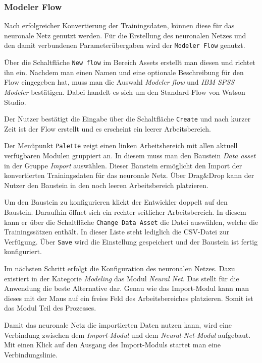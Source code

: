\subsubsection{Modeler Flow}
\label{subsub:modeler_flow}
Nach erfolgreicher Konvertierung der Trainingsdaten, können diese für das neuronale Netz genutzt werden. Für die
Erstellung des neuronalen Netzes und den damit verbundenen Parameterübergaben wird der \texttt{Modeler Flow} genutzt.

Über die Schaltfläche \texttt{New flow} im Bereich Assets erstellt man diesen und richtet ihn ein. Nachdem man einen Namen
und eine optionale Beschreibung für den Flow eingegeben hat, muss man die Auswahl \textit{Modeler flow} und
\textit{IBM SPSS Modeler} bestätigen. Dabei handelt es sich um den Standard-Flow von Watson Studio.

Der Nutzer bestätigt die Eingabe über die Schaltfläche \texttt{Create} und nach kurzer Zeit ist der Flow erstellt und es
erscheint ein leerer Arbeitsbereich.

Der Menüpunkt \texttt{Palette} zeigt einen linken Arbeitsbereich mit allen aktuell verfügbaren Modulen gruppiert an. In
diesem muss man den Baustein \textit{Data asset} in der Gruppe \textit{Import} auswählen. Dieser Baustein ermöglicht den
Import der konvertierten Trainingsdaten für das neuronale Netz. Über Drag\&Drop kann der Nutzer den Baustein in den noch
leeren Arbeitsbereich platzieren.

Um den Baustein zu konfigurieren klickt der Entwickler doppelt auf den Baustein. Daraufhin öffnet sich ein rechter
seitlicher Arbeitsbereich. In diesem kann er über die Schaltfläche \texttt{Change Data Asset} die Datei auswählen, welche
die Trainingssätzen enthält. In dieser Liste steht lediglich die CSV-Datei zur Verfügung. Über \texttt{Save} wird die
Einstellung gespeichert und der Baustein ist fertig konfiguriert.

Im nächsten Schritt erfolgt die Konfiguration des neuronalen Netzes. Dazu existiert in der Kategorie \textit{Modeling} das
Modul \textit{Neural Net}. Das stellt für die Anwendung die beste Alternative dar. Genau wie das Import-Modul kann
man dieses mit der Maus auf ein freies Feld des Arbeitsbereiches platzieren. Somit ist das Modul Teil des Prozesses.

Damit das neuronale Netz die importierten Daten nutzen kann, wird eine Verbindung zwischen dem \textit{Import-Modul} und
dem \textit{Neural-Net-Modul} aufgebaut. Mit einen Klick auf den Ausgang des Import-Moduls startet man eine
Verbindungslinie.

